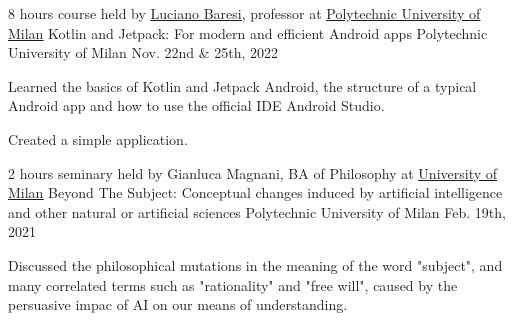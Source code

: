 \begin{cventries}
  \cventry
    {8 hours course held by \underline{\href{https://www.linkedin.com/in/luciano-baresi-5a867a1/}{Luciano Baresi}}, professor at \underline{\href{https://www.polimi.it/en/}{Polytechnic University of Milan}}} %
    {Kotlin and Jetpack: For modern and efficient Android apps} %
    {Polytechnic University of Milan} %
    {Nov. 22nd \& 25th, 2022} %
    {
      \begin{cvitems} %
        \item {Learned the basics of Kotlin and Jetpack Android, the structure of a typical Android app and how to use the official IDE Android Studio.}
        \item {Created a simple application.}
      \end{cvitems}
    }

  \cventry
    {2 hours seminary held by Gianluca Magnani, BA of Philosophy at \underline{\href{https://www.unimi.it/en}{University of Milan}}} %
    {Beyond The Subject: Conceptual changes induced by artificial intelligence and other natural or artificial sciences} %
    {Polytechnic University of Milan} %
    {Feb. 19th, 2021} %
    {
      \begin{cvitems} %
        \item {Discussed the philosophical mutations in the meaning of the word "subject", and many correlated terms such as "rationality" and "free will", caused by the persuasive impac of AI on our means of understanding.}
      \end{cvitems}
    }

\end{cventries}

